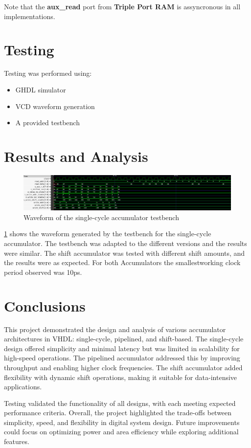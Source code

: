\documentclass[a4paper,12pt]{article}
\begin{document}
Note that the \textbf{aux\_read} port from \textbf{Triple Port RAM} is assyncronous in all implementations.

\section{Testing}
Testing was performed using:
\begin{itemize}
    \item GHDL simulator
    \item VCD waveform generation
    \item A provided testbench  %
\end{itemize}

\section{Results and Analysis}
\begin{figure}[H]
    \centering
    \includegraphics[width=0.8\linewidth]{waveform.png}
    \caption{Waveform of the single-cycle accumulator testbench}
    \label{fig:waveform}
\end{figure}

\ref{fig:waveform} shows the waveform generated by the testbench for the single-cycle accumulator. The testbench was adapted to the different versions and the results were similar. The shift accumulator was tested with different shift amounts, and the results were as expected.
For both Accumulators the smallestworking clock period observed was 10ps.

\section{Conclusions}
This project demonstrated the design and analysis of various accumulator architectures in VHDL: single-cycle, pipelined, and shift-based. The single-cycle design offered simplicity and minimal latency but was limited in scalability for high-speed operations. The pipelined accumulator addressed this by improving throughput and enabling higher clock frequencies. The shift accumulator added flexibility with dynamic shift operations, making it suitable for data-intensive applications.

Testing validated the functionality of all designs, with each meeting expected performance criteria. Overall, the project highlighted the trade-offs between simplicity, speed, and flexibility in digital system design. Future improvements could focus on optimizing power and area efficiency while exploring additional features.
\end{document}
